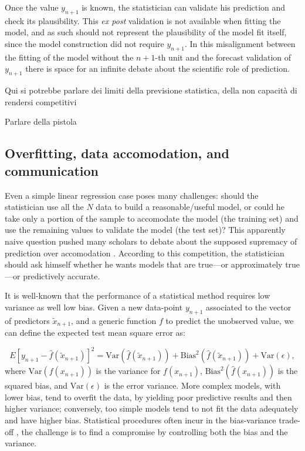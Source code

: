\documentclass{statsoc}
\begin{document}
Once the value $y_{n+1}$ is known, the statistician can validate his prediction and check its plausibility. This \emph{ex post} validation is not available when fitting the model, and as such should not represent the plausibility of the model fit itself, since the model construction did not require $y_{n+1}$. In this misalignment between the fitting of the model without the $n+1$-th unit and the forecast validation of $y_{n+1}$ there is space for an infinite debate about the scientific role of prediction.


\color{blue}

Qui si potrebbe parlare dei limiti della previsione statistica, della non capacità di rendersi competitivi

Parlare della pistola
\color{black}



\subsection{Overfitting, data accomodation, and communication}

Even a simple linear regression case poses many challenges: should the statistician use all the $N$ data to build a reasonable/useful model, or could he take only a portion of the 
sample to accomodate the model (the training set) and use the remaining values to validate the model (the test set)? This apparently naive question pushed many scholars to debate 
about the supposed supremacy of prediction over accomodation \citep{maher1988prediction, hitchcock2004prediction, worrall2014prediction}. According to this competition, the 
statistician should ask himself whether he wants models that are true---or  approximately true---or predictively accurate. 

It is well-known that the performance of a statistical method requires low variance as well low bias. Given a new data-point $y_{n+1}$ associated to the vector of predictors $\tilde{x}_{n+1}$, and a generic function $f$ to predict the unobserved value, we can define the expected test mean square error as:

\begin{equation}
E \left[ y_{n+1}-\hat{f}(\tilde{x}_{n+1}) \right]^2 = \text{Var}(\hat{f}(\tilde{x}_{n+1}))+ \text{Bias}^2(\hat{f}(\tilde{x}_{n+1}))+\text{Var}(\epsilon),
\label{eq:exp_MSE}
\end{equation}
%
where $\text{Var}(f(x_{n+1}))$ is the variance for $f(x_{n+1})$, $\text{Bias}^2(\hat{f}(x_{n+1}))$ is the squared bias, and $\text{Var}(\epsilon)$ is the error variance.
More complex models, with lower bias, tend to overfit the data, by yielding  poor  predictive results and then higher variance; conversely, too simple models tend to not fit the data adequately and have higher bias. Statistical procedures often incur in the bias-variance 
trade-off \citep{james2013introduction}, the challenge is to find a compromise by controlling both the bias and the variance.
\end{document}
